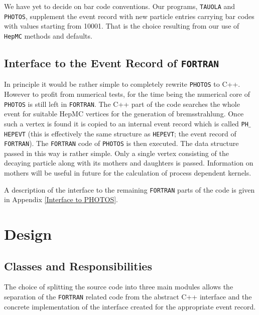 \documentclass[]{Photos_interface_design}
\begin{document}
We have yet to decide on bar code conventions. Our programs, {\tt TAUOLA} and
 {\tt PHOTOS}, supplement the event record with new particle entries carrying bar codes 
with values starting from 10001. That is the choice resulting from our use 
of {\tt HepMC} methods and defaults.  

\subsection{Interface to the Event Record of {\tt FORTRAN}}
\label{sect:F77fill}

In principle it would be rather simple to completely rewrite {\tt PHOTOS} to
C++. However to profit from numerical tests, for the time being the numerical core of {\tt PHOTOS}
is still left in {\tt FORTRAN}. The C++ part of the code searches the whole event for
suitable HepMC vertices for the generation of bremsstrahlung. Once such
a vertex is found it is copied to an internal event record  which is 
called  {\tt PH$\_$HEPEVT} (this is effectively the same structure as {\tt HEPEVT};
the event record of {\tt FORTRAN}).
The {\tt FORTRAN} code of {\tt PHOTOS} is then executed.
The data structure passed in this way is rather simple. Only a single vertex consisting
of the decaying particle along with its mothers and daughters is passed. Information 
on mothers will be useful in future for the calculation of process dependent 
kernels.



A description of the interface to the remaining {\tt FORTRAN} parts of the code is
given in  Appendix \ref{Interface to PHOTOS}.


\section{Design}
\label{sec:design}
\subsection{Classes and Responsibilities}

The choice of splitting the source code into three main modules
 allows the separation of the {\tt FORTRAN} related code from the abstract C++ interface
and the concrete implementation of the interface created for the appropriate
event record.
\end{document}
